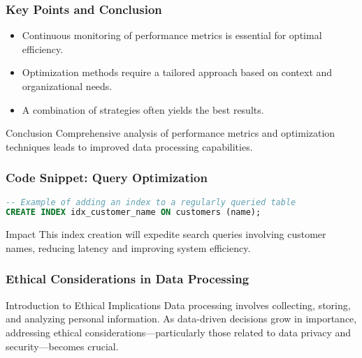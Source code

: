 \documentclass[aspectratio=169]{beamer}
\begin{document}
\begin{frame}[fragile]
    \frametitle{Key Points and Conclusion}
    \begin{itemize}
        \item Continuous monitoring of performance metrics is essential for optimal efficiency.
        \item Optimization methods require a tailored approach based on context and organizational needs.
        \item A combination of strategies often yields the best results.
    \end{itemize}
    \begin{block}{Conclusion}
        Comprehensive analysis of performance metrics and optimization techniques leads to improved data processing capabilities.
    \end{block}
\end{frame}

\begin{frame}[fragile]
    \frametitle{Code Snippet: Query Optimization}
    \begin{lstlisting}[language=SQL, basicstyle=\small]
-- Example of adding an index to a regularly queried table
CREATE INDEX idx_customer_name ON customers (name);
    \end{lstlisting}
    \begin{block}{Impact}
        This index creation will expedite search queries involving customer names, reducing latency and improving system efficiency.
    \end{block}
\end{frame}

\begin{frame}[fragile]
    \frametitle{Ethical Considerations in Data Processing}
    \begin{block}{Introduction to Ethical Implications}
        Data processing involves collecting, storing, and analyzing personal information. As data-driven decisions grow in importance, addressing ethical considerations—particularly those related to data privacy and security—becomes crucial.
    \end{block}
\end{frame}
\end{document}

